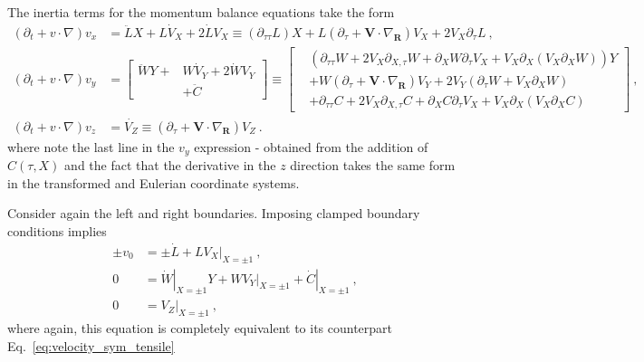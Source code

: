 \documentclass[12pt,a4paper]{article}
\begin{document}
The inertia terms for the momentum balance equations take the form
\begin{equation}\label{eq:accel_sym_tensile}
  \begin{split}
     \left(\partial_t + v\cdot\nabla\right)v_x & = \ddot{L} X + L \dot{V}_X + 2 \dot{L} V_X \equiv \left(\partial_{\tau\tau}L\right) X + L\left(\partial_\tau + \bm{V}\cdot\nabla_{\bm{R}}\right)V_X + 2 V_X \partial_\tau L \ ,\\
     \left(\partial_t + v\cdot\nabla\right)v_y & = \left[\begin{split}
                                                       \ddot{W} Y +& W \dot{V}_Y + 2 \dot{W} V_Y \\
                                                        & + \ddot{C}
                                                   \end{split}\right]\equiv \left[\begin{split}
                                                       &  \left(\partial_{\tau\tau}W + 2 V_X\partial_{X,\tau}W + \partial_X W \partial_\tau V_X + V_X\partial_X\left(V_X\partial_X W\right)\right)Y \\
                                                        & + W\left(\partial_\tau + \bm{V}\cdot\nabla_{\bm{R}}\right)V_Y + 2 V_Y \left(\partial_\tau W + V_X \partial_X W\right) \\
                                                        & + \partial_{\tau\tau}C + 2 V_X\partial_{X,\tau}C + \partial_X C \partial_\tau V_X + V_X\partial_X\left(V_X\partial_X C\right)
                                                   \end{split}\right] \ , \\
    \left(\partial_t + v\cdot\nabla\right)v_z & = \dot{V_Z} \equiv \left(\partial_\tau + \bm{V}\cdot\nabla_{\bm{R}}\right)V_Z \ .
  \end{split}
\end{equation}
where note the last line in the $v_y$ expression - obtained from the addition of $C\left(\tau,X\right)$ and the fact that the derivative in the $z$ direction takes the same form in the transformed and Eulerian coordinate systems.

Consider again the left and right boundaries. Imposing clamped boundary conditions implies
\begin{equation}\label{eq:velocity_x_bounds_asym_tensile}
  \begin{split}
     \pm v_0 & = \pm \dot{L} + L \left.V_X\right|_{X=\pm1} \ ,\\
     0 & = \left.\dot{W}\right|_{X=\pm1} Y + \left. W V_Y\right|_{X=\pm1} + \left.\dot{C}\right|_{X=\pm1}\ , \\
     0 & = \left.V_Z\right|_{X=\pm1} \ ,
  \end{split}
\end{equation}
where again, this equation is completely equivalent to its counterpart Eq.~\eqref{eq:velocity_sym_tensile}
\end{document}
